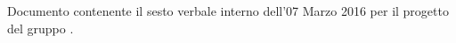 Documento contenente il sesto verbale interno dell'07 Marzo 2016 per il progetto \progetto{} del gruppo \gruppo{}.
